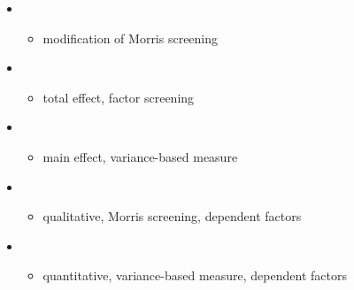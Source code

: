 \begin{frame}\vspace{0.3cm}

\begin{itemize}\small
	\item {}\vspace{0.3cm}
		\begin{itemize}\footnotesize
			\item \footnotesize modification of Morris screening\vspace{0.3cm}
		\end{itemize}
\item {}\vspace{0.3cm}
	\begin{itemize}\footnotesize
		\item \footnotesize total effect, factor screening\vspace{0.3cm}
	\end{itemize}
\item {}\vspace{0.3cm}
	\begin{itemize}\footnotesize
		\item \footnotesize main effect, variance-based measure
	\end{itemize}

\end{itemize}

\end{frame}
\begin{frame}

\begin{itemize}\small
\item {}\vspace{0.3cm}
\begin{itemize}\footnotesize
	\item \footnotesize qualitative, Morris screening, dependent factors\vspace{0.3cm}
\end{itemize}
\item {}\vspace{0.3cm}
\begin{itemize}\footnotesize
	\item quantitative, variance-based measure, dependent factors
\end{itemize}
\end{itemize}

\end{frame}
